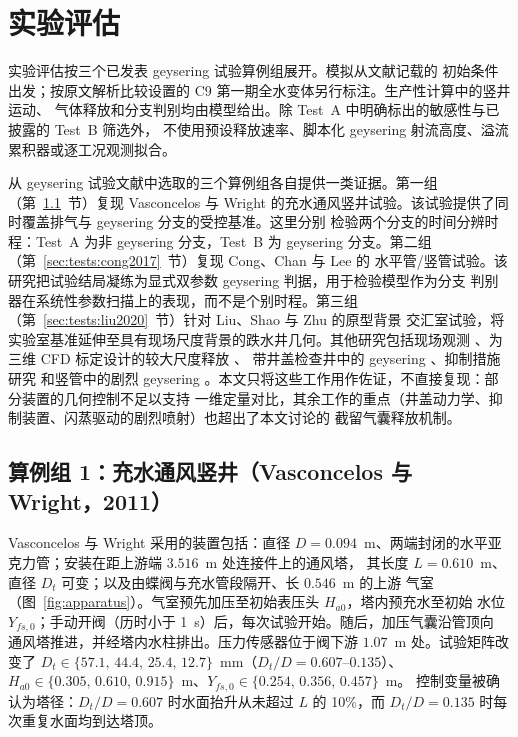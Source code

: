 \documentclass[preprint,12pt]{elsarticle}
\begin{document}



\section{实验评估}
\label{sec:tests}

实验评估按三个已发表 geysering 试验算例组展开。模拟从文献记载的
初始条件出发；按原文解析比较设置的 C9 第一期全水变体另行标注。生产性计算中的竖井运动、
气体释放和分支判别均由模型给出。除 Test~A 中明确标出的敏感性与已披露的 Test~B 筛选外，
不使用预设释放速率、脚本化 geysering 射流高度、溢流累积器或逐工况观测拟合。

从 geysering 试验文献中选取的三个算例组各自提供一类证据。第一组
（第~\ref{sec:tests:vw2011}~节）复现 Vasconcelos 与 Wright \cite{vasconcelos2011}
的充水通风竖井试验。该试验提供了同时覆盖排气与 geysering 分支的受控基准。这里分别
检验两个分支的时间分辨时程：Test~A 为非 geysering 分支，Test~B 为 geysering 分支。第二组
（第~\ref{sec:tests:cong2017}~节）复现 Cong、Chan 与 Lee \cite{cong2017} 的
水平管/竖管试验。该研究把试验结局凝练为显式双参数 geysering 判据，用于检验模型作为分支
判别器在系统性参数扫描上的表现，而不是个别时程。第三组
（第~\ref{sec:tests:liu2020}~节）针对 Liu、Shao 与 Zhu \cite{liu2020} 的原型背景
交汇室试验，将实验室基准延伸至具有现场尺度背景的跌水井几何。其他研究包括现场观测
\cite{wright2011note}、为三维 CFD 标定设计的较大尺度释放 \cite{muller2017}、
带井盖检查井中的 geysering \cite{zhang2022}、抑制措施研究 \cite{qian2020} 和竖管中的剧烈 geysering
\cite{leon2018}。本文只将这些工作用作佐证，不直接复现：部分装置的几何控制不足以支持
一维定量对比，其余工作的重点（井盖动力学、抑制装置、闪蒸驱动的剧烈喷射）也超出了本文讨论的
截留气囊释放机制。

\subsection{算例组 1：充水通风竖井（Vasconcelos 与 Wright，2011）}
\label{sec:tests:vw2011}

Vasconcelos 与 Wright \cite{vasconcelos2011} 采用的装置包括：直径
$D=0.094$~m、两端封闭的水平亚克力管；安装在距上游端 $3.516$~m 处连接件上的通风塔，
其长度 $L=0.610$~m、直径 $D_t$ 可变；以及由蝶阀与充水管段隔开、长 $0.546$~m 的上游
气室（图~\ref{fig:apparatus}）。气室预先加压至初始表压头 $H_{a0}$，塔内预充水至初始
水位 $Y_{fs,0}$；手动开阀（历时小于 1~s）后，每次试验开始。随后，加压气囊沿管顶向
通风塔推进，并经塔内水柱排出。压力传感器位于阀下游 $1.07$~m 处。试验矩阵改变了
$D_t\in\{57.1,\,44.4,\,25.4,\,12.7\}$~mm（$D_t/D=0.607$--$0.135$）、
$H_{a0}\in\{0.305,\,0.610,\,0.915\}$~m、$Y_{fs,0}\in\{0.254,\,0.356,\,0.457\}$~m。
控制变量被确认为塔径：$D_t/D=0.607$ 时水面抬升从未超过 $L$ 的 10\%，而
$D_t/D=0.135$ 时每次重复水面均到达塔顶。
\end{document}
